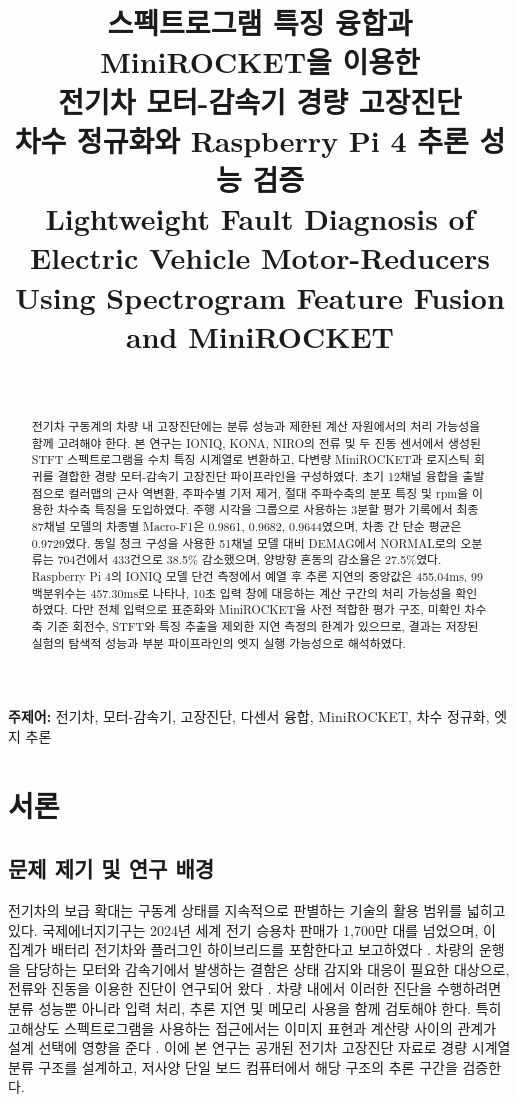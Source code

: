 \documentclass[11pt,a4paper]{article}
\title{스펙트로그램 특징 융합과 MiniROCKET을 이용한\\전기차 모터-감속기 경량 고장진단\\[4pt]
\large 차수 정규화와 Raspberry Pi 4 추론 성능 검증\\[8pt]
\normalsize Lightweight Fault Diagnosis of Electric Vehicle Motor-Reducers\\Using Spectrogram Feature Fusion and MiniROCKET}
\author{\checkneeded{저자명 및 저자 순서}\\\small\checkneeded{소속 및 교신저자}}
\date{}
\begin{document}
\maketitle
\begin{abstract}
전기차 구동계의 차량 내 고장진단에는 분류 성능과 제한된 계산 자원에서의 처리 가능성을 함께 고려해야 한다.
본 연구는 IONIQ, KONA, NIRO의 전류 및 두 진동 센서에서 생성된 STFT 스펙트로그램을 수치 특징 시계열로 변환하고, 다변량 MiniROCKET과 로지스틱 회귀를 결합한 경량 모터-감속기 고장진단 파이프라인을 구성하였다.
초기 12채널 융합을 출발점으로 컬러맵의 근사 역변환, 주파수별 기저 제거, 절대 주파수축의 분포 특징 및 rpm을 이용한 차수축 특징을 도입하였다.
주행 시각을 그룹으로 사용하는 3분할 평가 기록에서 최종 87채널 모델의 차종별 Macro-F1은 0.9861, 0.9682, 0.9644였으며, 차종 간 단순 평균은 0.9729였다.
동일 청크 구성을 사용한 51채널 모델 대비 DEMAG에서 NORMAL로의 오분류는 704건에서 433건으로 38.5\% 감소했으며, 양방향 혼동의 감소율은 27.5\%였다.
Raspberry Pi 4의 IONIQ 모델 단건 측정에서 예열 후 추론 지연의 중앙값은 455.04ms, 99백분위수는 457.30ms로 나타나, 10초 입력 창에 대응하는 계산 구간의 처리 가능성을 확인하였다.
다만 전체 입력으로 표준화와 MiniROCKET을 사전 적합한 평가 구조, 미확인 차수축 기준 회전수, STFT와 특징 추출을 제외한 지연 측정의 한계가 있으므로, 결과는 저장된 실험의 탐색적 성능과 부분 파이프라인의 엣지 실행 가능성으로 해석하였다.
\end{abstract}
\noindent\textbf{주제어:} 전기차, 모터-감속기, 고장진단, 다센서 융합, MiniROCKET, 차수 정규화, 엣지 추론

\section{서론}
\subsection{문제 제기 및 연구 배경}
전기차의 보급 확대는 구동계 상태를 지속적으로 판별하는 기술의 활용 범위를 넓히고 있다.
국제에너지기구는 2024년 세계 전기 승용차 판매가 1,700만 대를 넘었으며, 이 집계가 배터리 전기차와 플러그인 하이브리드를 포함한다고 보고하였다 \citep{iea2025}.
차량의 운행을 담당하는 모터와 감속기에서 발생하는 결함은 상태 감지와 대응이 필요한 대상으로, 전류와 진동을 이용한 진단이 연구되어 왔다 \citep{park2024}.
차량 내에서 이러한 진단을 수행하려면 분류 성능뿐 아니라 입력 처리, 추론 지연 및 메모리 사용을 함께 검토해야 한다.
특히 고해상도 스펙트로그램을 사용하는 접근에서는 이미지 표현과 계산량 사이의 관계가 설계 선택에 영향을 준다 \citep{park2024}.
이에 본 연구는 공개된 전기차 고장진단 자료로 경량 시계열 분류 구조를 설계하고, 저사양 단일 보드 컴퓨터에서 해당 구조의 추론 구간을 검증한다.
\end{document}
